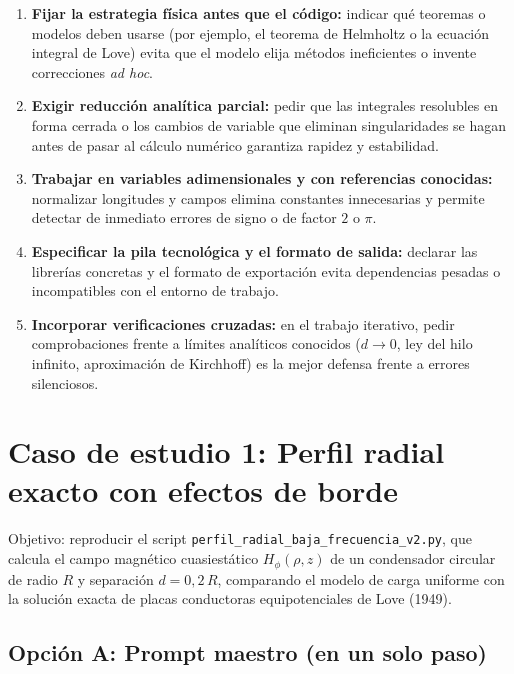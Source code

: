 \documentclass[11pt]{article}
\begin{document}
\begin{enumerate}
    \item \textbf{Fijar la estrategia física antes que el código:} indicar qué teoremas o modelos deben usarse (por ejemplo, el teorema de Helmholtz o la ecuación integral de Love) evita que el modelo elija métodos ineficientes o invente correcciones \textit{ad hoc}.
    \item \textbf{Exigir reducción analítica parcial:} pedir que las integrales resolubles en forma cerrada o los cambios de variable que eliminan singularidades se hagan antes de pasar al cálculo numérico garantiza rapidez y estabilidad.
    \item \textbf{Trabajar en variables adimensionales y con referencias conocidas:} normalizar longitudes y campos elimina constantes innecesarias y permite detectar de inmediato errores de signo o de factor $2$ o $\pi$.
    \item \textbf{Especificar la pila tecnológica y el formato de salida:} declarar las librerías concretas y el formato de exportación evita dependencias pesadas o incompatibles con el entorno de trabajo.
    \item \textbf{Incorporar verificaciones cruzadas:} en el trabajo iterativo, pedir comprobaciones frente a límites analíticos conocidos ($d \to 0$, ley del hilo infinito, aproximación de Kirchhoff) es la mejor defensa frente a errores silenciosos.
\end{enumerate}

\section{Caso de estudio 1: Perfil radial exacto con efectos de borde}

Objetivo: reproducir el script \texttt{perfil\_radial\_baja\_frecuencia\_v2.py}, que calcula el campo magnético cuasiestático $H_\phi(\rho, z)$ de un condensador circular de radio $R$ y separación $d = 0{,}2\,R$, comparando el modelo de carga uniforme con la solución exacta de placas conductoras equipotenciales de Love (1949).

\subsection{Opción A: Prompt maestro (en un solo paso)}
\end{document}
